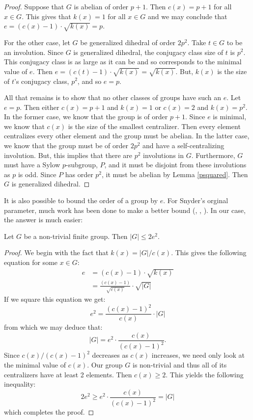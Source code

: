 \documentclass[main.tex]{subfiles}
\begin{document}
\begin{proof}
Suppose that $G$ is abelian of order $p+1$. Then $c(x) = p+1$ for all $x \in G$. This gives that $k(x) = 1$ for all $x \in G$ and we may conclude that $e = (c(x) - 1) \cdot \sqrt{k(x)} = p$.

For the other case, let $G$ be generalized dihedral of order $2p^2$. Take $t \in G$ to be an involution. Since $G$ is generalized dihedral, the conjugacy class size of $t$ is $p^2$. This conjugacy class is as large as it can be and so corresponds to the minimal value of $e$. Then $e = (c(t) - 1) \cdot \sqrt{k(x)} = \sqrt{k(x)}$. But, $k(x)$ is the size of $t$'s conjugacy class, $p^2$, and so $e = p$.

All that remains is to show that no other classes of groups have such an $e$. Let $e = p$. Then either $c(x) = p+1$ and $k(x) = 1$ or $c(x) = 2$ and $k(x) = p^2$. In the former case, we know that the group is of order $p+1$. Since $e$ is minimal, we know that $c(x)$ is the size of the smallest centralizer. Then every element centralizes every other element and the group must be abelian. In the latter case, we know that the group must be of order $2p^2$ and have a self-centralizing involution. But, this implies that there are $p^2$ involutions in $G$. Furthermore, $G$ must have a Sylow $p$-subgroup, $P$, and it must be disjoint from these involutions as $p$ is odd. Since $P$ has order $p^2$, it must be abelian by Lemma \ref{psquared}. Then $G$ is generalized dihedral.
\end{proof}

It is also possible to bound the order of a group by $e$. For Snyder's orginal parameter, much work has been done to make a better bound (\cite{isaacsarticle}, \cite{durfeejensenarticle}, \cite{lewisarticle}). In our case, the answer is much easier:

\begin{theorem}\label{ebound}
Let $G$ be a non-trivial finite group. Then $|G| \le 2e^2$.
\end{theorem}

\begin{proof}
We begin with the fact that $k(x) = |G|/c(x)$. This gives the following equation for some $x \in G$:
\begin{align*}
e &= (c(x) - 1) \cdot \sqrt{k(x)} \\
&= \frac{(c(x) - 1)}{\sqrt{c(x)}} \cdot \sqrt{|G|}
\end{align*}
If we square this equation we get:
$$e^2 = \frac{(c(x) - 1)^2}{c(x)} \cdot |G|$$
from which we may deduce that:
$$|G| = e^2 \cdot \frac{c(x)}{(c(x) -1)^2}\text{.}$$
Since $c(x)/(c(x) - 1)^2$ decreases as $c(x)$ increases, we need only look at the minimal value of $c(x)$. Our group $G$ is non-trivial and thus all of its centralizers have at least 2 elements. Then $c(x) \ge 2$. This yields the following inequality:
$$2e^2 \ge e^2 \cdot \frac{c(x)}{(c(x) - 1)^2} = |G|$$
which completes the proof.
\end{proof}
\end{document}
